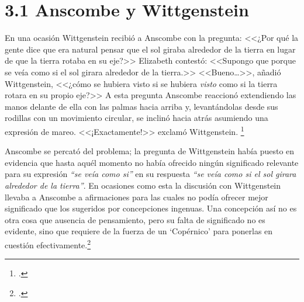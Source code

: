 
\section{3.1 Anscombe y Wittgenstein}

En una ocasión Wittgenstein
recibió a Anscombe con la pregunta: <<¿Por qué la gente dice que era natural
pensar que el sol giraba alrededor de la tierra en lugar de que la tierra rotaba
en su eje?>> Elizabeth contestó: <<Supongo que porque se veía como si el sol
girara alrededor de la tierra.>> <<Bueno\ldots>>, añadió Wittgenstein, <<¿cómo
se hubiera visto si se hubiera \emph{visto} como si la tierra rotara en su
propio eje?>> A esta pregunta Anscombe reaccionó extendiendo las manos delante
de ella con las palmas hacia arriba y, levantándolas desde sus rodillas con un
movimiento circular, se inclinó hacia atrás asumiendo una expresión de mareo.
<<¡Exactamente!>> exclamó Wittgenstein. \footcite[cf.][151]{IWT} 

Anscombe se percató del problema; la
pregunta de Wittgenstein había puesto en evidencia que hasta aquél momento no
había ofrecido ningún significado relevante para su expresión \emph{``se veía como
si''} en su  respuesta \emph{``se veía como si el sol girara alrededor de la tierra''}. 
En ocasiones como esta la discusión con Wittgenstein llevaba a Anscombe a
afirmaciones para las cuales no podía ofrecer mejor significado que los
sugeridos por concepciones ingenuas. Una concepción así no es otra cosa que
ausencia de pensamiento, pero su falta de significado no es evidente, sino que
requiere de la fuerza de un `Copérnico' para ponerlas en cuestión
efectivamente.\footcite[cf. 151]{IWT} 




